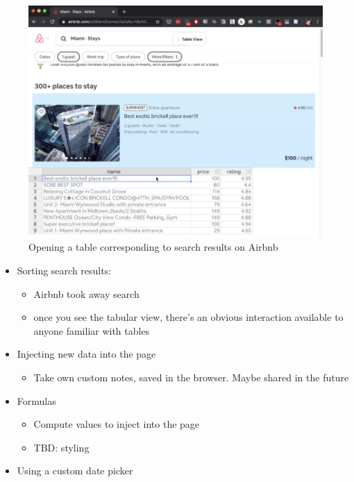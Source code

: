 \documentclass[english,submission]{programming}
\providecommand{\tightlist}{%
  \setlength{\itemsep}{0pt}\setlength{\parskip}{0pt}}
\begin{document}
\begin{figure}
\hypertarget{fig:table}{%
\centering
\includegraphics{media/opentable.png}
\caption{Opening a table corresponding to search results on
Airbnb}\label{fig:table}
}
\end{figure}

\begin{itemize}
\tightlist
\item
  Sorting search results:

  \begin{itemize}
  \tightlist
  \item
    Airbnb took away search
  \item
    once you see the tabular view, there's an obvious interaction
    available to anyone familiar with tables
  \end{itemize}
\item
  Injecting new data into the page

  \begin{itemize}
  \tightlist
  \item
    Take own custom notes, saved in the browser. Maybe shared in the
    future
  \end{itemize}
\item
  Formulas

  \begin{itemize}
  \tightlist
  \item
    Compute values to inject into the page
  \item
    TBD: styling
  \end{itemize}
\item
  Using a custom date picker
\end{itemize}
\end{document}
